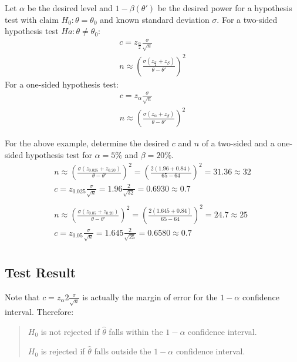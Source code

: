 \documentclass[letterpaper,12pt,fleqn]{article}
\renewcommand{\O}{\theta}
\renewcommand{\o}{\sigma}
\renewcommand{\a}{\alpha}
\renewcommand{\b}{\beta}
\begin{document}
\begin{theorem}
  Let \(\a\) be the desired level and \(1-\b(\O')\) be the desired power for a hypothesis test with claim \(H_0:\O=\O_0\) and
  known standard deviation \(\o\).  For a two-sided hypothesis test \(Ha:\O\ne\O_0\):
  \begin{gather*}
    c=z_{\frac{\a}{2}}\frac{\o}{\sqrt{n}} \\
    n\approx\left(\frac{\o\left(z_{\frac{\a}{2}}+z_{\b}\right)}{\O-\O'}\right)^2
  \end{gather*}
  For a one-sided hypothesis test:
  \begin{gather*}
    c=z_{\a}\frac{\o}{\sqrt{n}} \\
    n\approx\left(\frac{\o\left(z_{\a}+z_{\b}\right)}{\O-\O'}\right)^2
  \end{gather*}
\end{theorem}

\begin{example}
  For the above example, determine the desired \(c\) and \(n\) of a two-sided and a one-sided hypothesis test for
  \(\a=5\%\) and \(\b=20\%\).
  \begin{gather*}
    n\approx\left(\frac{\o\left(z_{0.025}+z_{0.20}\right)}{\O-\O'}\right)^2=
    \left(\frac{2\left(1.96+0.84\right)}{65-64}\right)^2=31.36\approx32 \\
    c=z_{0.025}\frac{\o}{\sqrt{n}}=1.96\frac{2}{\sqrt{32}}=0.6930\approx0.7 \\
    \\
    n\approx\left(\frac{\o\left(z_{0.05}+z_{0.20}\right)}{\O-\O'}\right)^2=
    \left(\frac{2\left(1.645+0.84\right)}{65-64}\right)^2=24.7\approx25 \\
    c=z_{0.05}\frac{\o}{\sqrt{n}}=1.645\frac{2}{\sqrt{25}}=0.6580\approx0.7 \\
  \end{gather*}
\end{example}

\subsection*{Test Result}

Note that \(\displaystyle c=z_{\a}{2}\frac{\o}{\sqrt{n}}\) is actually the margin of error for the \(1-\a\) confidence
interval.  Therefore:
\begin{quote}
  \(H_0\) is not rejected if \(\hat{\O}\) falls within the \(1-\a\) confidence interval.

  \(H_0\) is rejected if \(\hat{\O}\) falls outside the \(1-\a\) confidence interval.
\end{quote}
\end{document}
